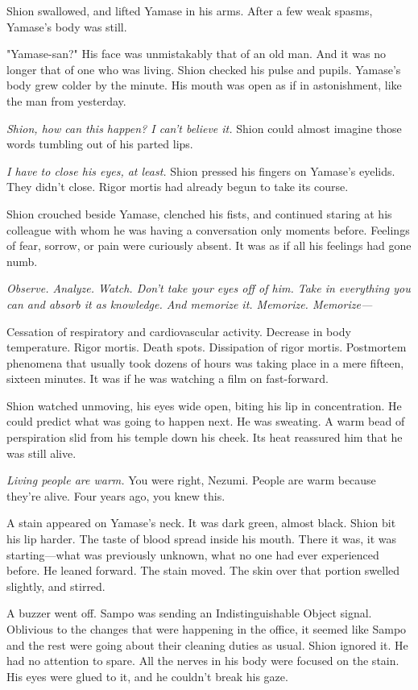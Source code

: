 Shion swallowed, and lifted Yamase in his arms. After a few weak spasms,
Yamase's body was still.

"Yamase-san?" His face was unmistakably that of an old man. And it was
no longer that of one who was living. Shion checked his pulse and
pupils. Yamase's body grew colder by the minute. His mouth was open as
if in astonishment, like the man from yesterday.

\emph{Shion, how can this happen? I can't believe it.} Shion could almost
imagine those words tumbling out of his parted lips.

\emph{I have to close his eyes, at least.} Shion pressed his fingers on
Yamase's eyelids. They didn't close. Rigor mortis had already begun to
take its course.

Shion crouched beside Yamase, clenched his fists, and continued staring
at his colleague with whom he was having a conversation only moments
before. Feelings of fear, sorrow, or pain were curiously absent. It was
as if all his feelings had gone numb.

\emph{Observe. Analyze. Watch. Don't take your eyes off of him. Take in
everything you can and absorb it as knowledge. And memorize it.
Memorize. Memorize---}

Cessation of respiratory and cardiovascular activity. Decrease in body
temperature. Rigor mortis. Death spots. Dissipation of rigor mortis.
Postmortem phenomena that usually took dozens of hours was taking place
in a mere fifteen, sixteen minutes. It was if he was watching a film on
fast-forward.

Shion watched unmoving, his eyes wide open, biting his lip in
concentration. He could predict what was going to happen next. He was
sweating. A warm bead of perspiration slid from his temple down his
cheek. Its heat reassured him that he was still alive.

\emph{Living people are warm.} You were right, Nezumi. People are warm because
they're alive. Four years ago, you knew this.

A stain appeared on Yamase's neck. It was dark green, almost black.
Shion bit his lip harder. The taste of blood spread inside his mouth.
There it was, it was starting---what was previously unknown, what no one
had ever experienced before. He leaned forward. The stain moved. The
skin over that portion swelled slightly, and stirred.

A buzzer went off. Sampo was sending an Indistinguishable Object signal.
Oblivious to the changes that were happening in the office, it seemed
like Sampo and the rest were going about their cleaning duties as usual.
Shion ignored it. He had no attention to spare. All the nerves in his
body were focused on the stain. His eyes were glued to it, and he
couldn't break his gaze.

